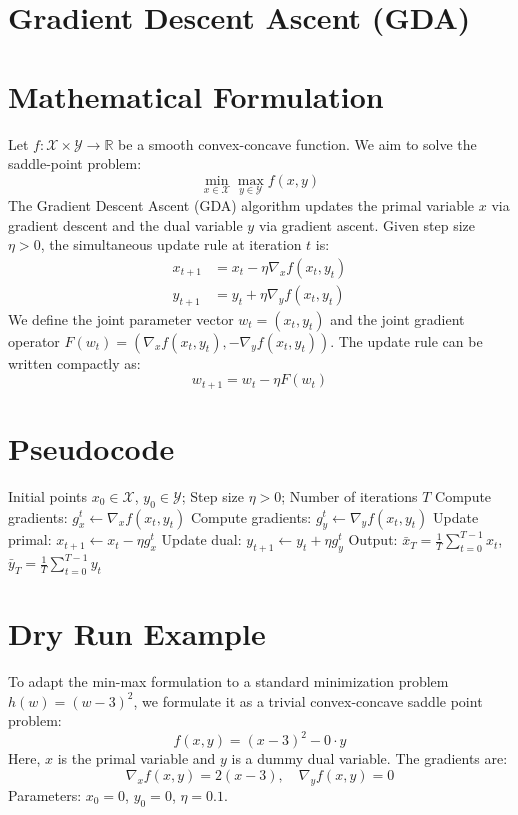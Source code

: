 \documentclass{article}
\begin{document}
\section*{Gradient Descent Ascent (GDA)}

\section*{Mathematical Formulation}
Let $f: \mathcal{X} \times \mathcal{Y} \to \mathbb{R}$ be a smooth convex-concave function. We aim to solve the saddle-point problem:
$$ \min_{x \in \mathcal{X}} \max_{y \in \mathcal{Y}} f(x, y) $$
The Gradient Descent Ascent (GDA) algorithm updates the primal variable $x$ via gradient descent and the dual variable $y$ via gradient ascent. Given step size $\eta > 0$, the simultaneous update rule at iteration $t$ is:
\begin{align*}
x_{t+1} &= x_t - \eta \nabla_x f(x_t, y_t) \\
y_{t+1} &= y_t + \eta \nabla_y f(x_t, y_t)
\end{align*}
We define the joint parameter vector $w_t = (x_t, y_t)$ and the joint gradient operator $F(w_t) = (\nabla_x f(x_t, y_t), -\nabla_y f(x_t, y_t))$. The update rule can be written compactly as:
$$ w_{t+1} = w_t - \eta F(w_t) $$

\section*{Pseudocode}
\begin{algorithm}[H]
\caption{Gradient Descent Ascent (GDA)}
\begin{algorithmic}[1]
\REQUIRE Initial points $x_0 \in \mathcal{X}$, $y_0 \in \mathcal{Y}$; Step size $\eta > 0$; Number of iterations $T$
\STATE Compute gradients: $g_x^t \gets \nabla_x f(x_t, y_t)$
\STATE Compute gradients: $g_y^t \gets \nabla_y f(x_t, y_t)$
\STATE Update primal: $x_{t+1} \gets x_t - \eta g_x^t$
\STATE Update dual: $y_{t+1} \gets y_t + \eta g_y^t$
\ENDFOR
\STATE Output: $\bar{x}_T = \frac{1}{T} \sum_{t=0}^{T-1} x_t$, $\bar{y}_T = \frac{1}{T} \sum_{t=0}^{T-1} y_t$
\end{algorithmic}
\end{algorithm}

\section*{Dry Run Example}
To adapt the min-max formulation to a standard minimization problem $h(w) = (w-3)^2$, we formulate it as a trivial convex-concave saddle point problem:
$$ f(x,y) = (x-3)^2 - 0 \cdot y $$
Here, $x$ is the primal variable and $y$ is a dummy dual variable. The gradients are:
$$ \nabla_x f(x,y) = 2(x-3), \quad \nabla_y f(x,y) = 0 $$
Parameters: $x_0 = 0$, $y_0 = 0$, $\eta = 0.1$.
\end{document}
